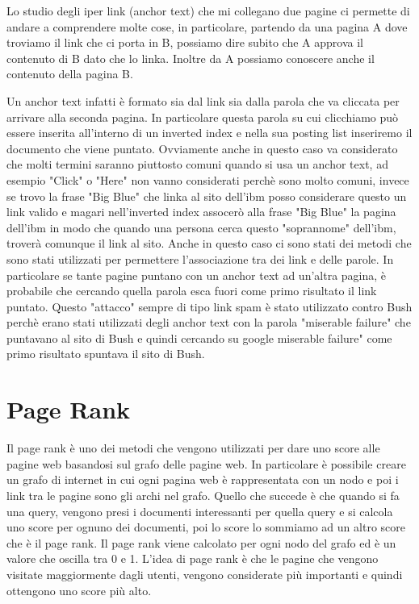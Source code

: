 \documentclass[14pt]{extreport}
\begin{document}
Lo studio degli iper link (anchor text) che mi collegano due pagine ci permette di andare a comprendere molte cose, in particolare, partendo da una pagina A dove troviamo il link che ci porta in B, possiamo dire subito che A approva il contenuto di B dato che lo linka. Inoltre da A possiamo conoscere anche il contenuto della pagina B.

Un anchor text infatti è formato sia dal link sia dalla parola che va cliccata per arrivare alla seconda pagina. In particolare questa parola su cui clicchiamo può essere inserita all'interno di un inverted index e nella sua posting list inseriremo il documento che viene puntato. Ovviamente anche in questo caso va considerato che molti termini saranno piuttosto comuni quando si usa un anchor text, ad esempio "Click" o "Here" non vanno considerati perchè sono molto comuni, invece se trovo la frase "Big Blue" che linka al sito dell'ibm posso considerare questo un link valido e magari nell'inverted index assocerò alla frase "Big Blue" la pagina dell'ibm in modo che quando una persona cerca questo "soprannome" dell'ibm, troverà comunque il link al sito.
Anche in questo caso ci sono stati dei metodi che sono stati utilizzati per permettere l'associazione tra dei link e delle parole. In particolare se tante pagine puntano con un anchor text ad un'altra pagina, è probabile che cercando quella parola esca fuori come primo risultato il link puntato. Questo "attacco" sempre di tipo link spam è stato utilizzato contro Bush perchè erano stati utilizzati degli anchor text con la parola "miserable failure" che puntavano al sito di Bush e quindi cercando su google miserable failure" come primo risultato spuntava il sito di Bush.

\section{Page Rank}

Il page rank è uno dei metodi che vengono utilizzati per dare uno score alle pagine web basandosi sul grafo delle pagine web. In particolare è possibile creare un grafo di internet in cui ogni pagina web è rappresentata con un nodo e poi i link tra le pagine sono gli archi nel grafo.
Quello che succede è che quando si fa una query, vengono presi i documenti interessanti per quella query e si calcola uno score per ognuno dei documenti, poi lo score lo sommiamo ad un altro score che è il page rank.
Il page rank viene calcolato per ogni nodo del grafo ed è un valore che oscilla tra 0 e 1.
L'idea di page rank è che le pagine che vengono visitate maggiormente dagli utenti, vengono considerate più importanti e quindi ottengono uno score più alto. 
\end{document}
